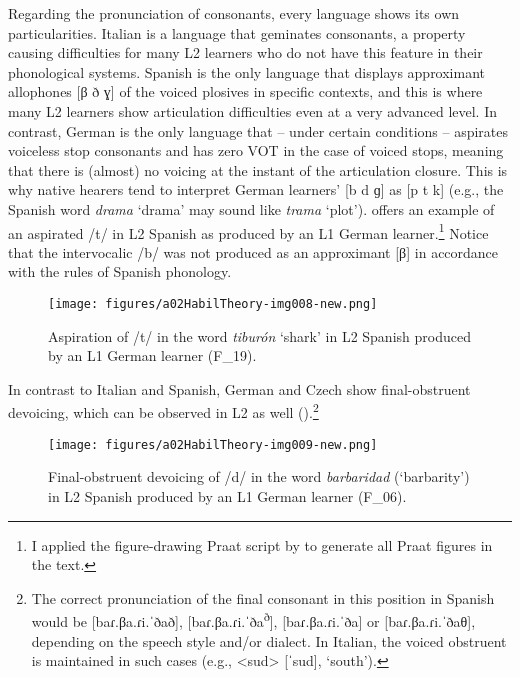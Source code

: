 Regarding the pronunciation of consonants, every language shows its own particularities. Italian is a language that geminates consonants, a property causing difficulties for many L2 learners who do not have this feature in their phonological systems. Spanish is the only language that displays approximant allophones [β ð ɣ] of the voiced plosives in specific contexts, and this is where many L2 learners show articulation difficulties even at a very advanced level. In contrast, German is the only language that -- under certain conditions -- aspirates voiceless stop consonants and has zero VOT in the case of voiced stops, meaning that there is (almost) no voicing at the instant of the articulation closure. This is why native hearers tend to interpret German learners’ [b d ɡ] as [p t k] (e.g., the Spanish word \textit{drama} ‘drama’ may sound like \textit{trama} ‘plot’).  offers an example of an aspirated /t/ in L2 Spanish as produced by an L1 German learner.\footnote{I applied the figure-drawing Praat script by \citet{Elvira-García2014} to generate all Praat figures in the text.} Notice that the intervocalic /b/ was not produced as an approximant [β] in accordance with the rules of Spanish phonology.


\vfill
\begin{figure}[H]
\texttt{[image: figures/a02HabilTheory-img008-new.png]}
\caption{Aspiration of /t/ in the word \textit{tiburón} ‘shark’ in L2 Spanish produced by an L1 German learner (F\_19).}
\label{fig:2.7}
\end{figure}
\vfill\pagebreak


In contrast to Italian and Spanish, German and Czech show final-obstruent devoicing, which can be observed in L2 as well ().\footnote{The correct pronunciation of the final consonant in this position in Spanish would be [\textrm{baɾ.βa.ɾi.ˈðað}], [\textrm{baɾ.βa.ɾi.ˈða}\textrm{\textsuperscript{ð}}], [\textrm{baɾ.βa.ɾi.ˈða}] or [\textrm{baɾ.βa.ɾi.ˈðaθ}], depending on the speech style and/or dialect. In Italian, the voiced obstruent is maintained in such cases (e.g., <sud> [\textrm{ˈsud}], ‘south’).}



\begin{figure}
\texttt{[image: figures/a02HabilTheory-img009-new.png]}



\caption{Final-obstruent devoicing of /d/ in the word \textit{barbaridad} (‘barbarity’) in L2 Spanish produced by an L1 German learner (F\_06).}
\label{fig:2.8}
\end{figure}


